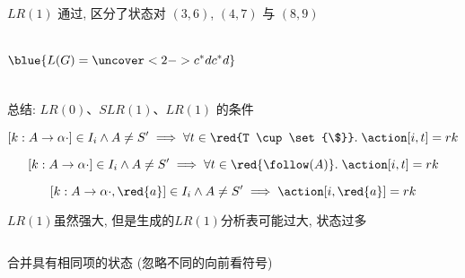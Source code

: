 \begin{frame}{}
  \begin{center}
    \begin{columns}
    \end{columns}

    \vspace{0.60cm}
    $LR(1)$ 通过, 区分了状态对 $(3, 6)$, $(4, 7)$ 与 $(8, 9)$
  \end{center}
\end{frame}

\begin{frame}{}
  \begin{center}

    \begin{columns}

        \[
          \blue{L(G) = \uncover<2->{c^{\ast}dc^{\ast}d}}
        \]
    \end{columns}
  \end{center}
\end{frame}

\begin{frame}{}
  \begin{center}
    总结: $LR(0)$、$SLR(1)$、$LR(1)$ 的条件

    \[
      [k: A \to \alpha \cdot] \in I_{i} \land A \neq S' \implies
        \forall t \in \red{T \cup \set{\$}}.\; \action[i, t] = rk
    \]

    \[
      [k: A \to \alpha \cdot] \in I_{i} \land A \neq S' \implies
        \forall t \in \red{\follow(A)}.\; \action[i, t] = rk
    \]

    \[
      [k: A \to \alpha \cdot, \red{a}] \in I_{i} \land A \neq S' \implies
        \action[i, \red{a}] = rk
    \]
  \end{center}
\end{frame}

\begin{frame}{}
  \begin{center}
    $LR(1)$虽然强大, 但是生成的$LR(1)$分析表可能过大, 状态过多

    \begin{columns}
    \end{columns}

    \pause
    \vspace{0.10cm}
     合并具有相同项的状态 (忽略不同的向前看符号)
  \end{center}
\end{frame}


